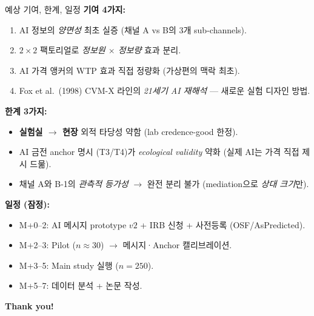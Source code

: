 \documentclass[aspectratio=169]{beamer}
\begin{document}
\begin{frame}{예상 기여, 한계, 일정}
  \footnotesize
  \textbf{기여 4가지:}
  \begin{enumerate}\itemsep0.1em
    \item AI 정보의 \emph{양면성} 최초 실증 (채널 A vs B의 3개 sub-channels).
    \item $2 \times 2$ 팩토리얼로 \emph{정보원 $\times$ 정보량} 효과 분리.
    \item AI 가격 앵커의 WTP 효과 직접 정량화 (가상편의 맥락 최초).
    \item Fox et al.\ (1998) CVM-X 라인의 \emph{21세기 AI 재해석} --- 새로운 실험 디자인 방법.
  \end{enumerate}

  \vspace{0.4em}
  \textbf{한계 3가지:}
  \begin{itemize}\itemsep0.05em
    \item \textbf{실험실 $\rightarrow$ 현장} 외적 타당성 약함 (lab credence-good 한정).
    \item AI 금전 anchor 명시 (T3/T4)가 \emph{ecological validity} 약화 (실제 AI는 가격 직접 제시 드묾).
    \item 채널 A와 B-1의 \emph{관측적 등가성} $\rightarrow$ 완전 분리 불가 (mediation으로 \emph{상대 크기}만).
  \end{itemize}

  \vspace{0.4em}
  \textbf{일정 (잠정):}
  \begin{itemize}\itemsep0.05em
    \item M+0--2: AI 메시지 prototype $v2$ + IRB 신청 + 사전등록 (OSF/AsPredicted).
    \item M+2--3: Pilot ($n \approx 30$) $\rightarrow$ 메시지·Anchor 캘리브레이션.
    \item M+3--5: Main study 실행 ($n = 250$).
    \item M+5--7: 데이터 분석 + 논문 작성.
  \end{itemize}

  \vspace{0.2em}
\end{frame}

{
\begin{frame}[plain]
  \centering
  \vfill
  {\color{white}\Huge\textbf{Thank you!}\par}
  \vfill
\end{frame}
}
\end{document}
